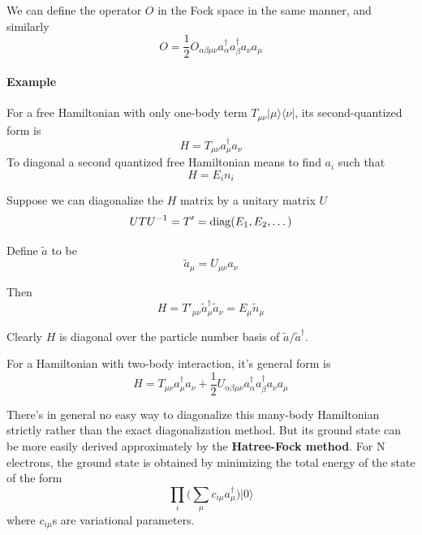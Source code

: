 \documentclass[12pt]{book}
\begin{document}
	We can define the operator $O$ in the Fock space in the same manner, and similarly
	\begin{equation}
		O=\frac 12O_{\alpha\beta\mu\nu}a_{\alpha}^\dagger a_{\beta}^\dagger a_\nu a_\mu
	\end{equation}
	\paragraph{Example}
	For a free Hamiltonian with only one-body term $T_{\mu\nu}|\mu\rangle\langle\nu|$, its second-quantized form is
	\begin{equation}
		H=T_{\mu\nu} a_\mu^\dagger a_\nu
	\end{equation}
	To diagonal a second quantized free Hamiltonian means to find $a_i$ such that
	\begin{equation}
		H=E_in_i
	\end{equation}
	
	Suppose we can diagonalize the $H$ matrix by a unitary matrix $U$ 
	\begin{equation}
		UTU^{-1}=T'={\rm diag}(E_1,E_2,\dots)
	\end{equation}
	
	Define $\tilde{a}$ to be 
	\begin{equation}
		\tilde{a}_\mu=U_{\mu\nu}a_\nu
	\end{equation}
	
	Then
	\begin{equation}
		H=T'_{\mu\nu} \tilde{a}_\mu^\dagger \tilde{a}_\nu=E_\mu \tilde{n}_\mu
	\end{equation}
	
	Clearly $H$ is diagonal over the particle number basis of $\tilde{a}/\tilde{a}^\dagger$.
	
	For a Hamiltonian with two-body interaction, it's general form is 
	\begin{equation}
		H=T_{\mu\nu} a_\mu^\dagger a_\nu+\frac 12U_{\alpha\beta\mu\nu}a_{\alpha}^\dagger a_{\beta}^\dagger a_\nu a_\mu
	\end{equation}
	
	There's in general no easy way to diagonalize this many-body Hamiltonian strictly rather than the exact diagonalization method. But its ground state can be more easily derived approximately by the \textbf{Hatree-Fock method}. For N electrons, the ground state is obtained by minimizing the total energy of the state of the form
	\begin{equation}
		\prod_i\Big(\sum_\mu c_{i\mu}a_\mu^\dagger\Big)|0\rangle
	\end{equation}
	where $c_{i\mu}$s are variational parameters.	
	
\end{document}
